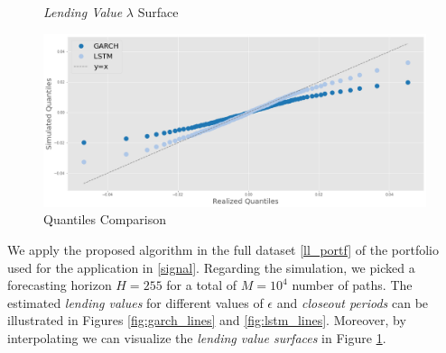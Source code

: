 \documentclass[a4paper, oneside]{discothesis}
\begin{document}
\begin{figure}[h]
    \centering
    \qquad
    \caption{\textit{Lending Value} $\lambda$ Surface}
    \label{fig:surface_LL}
\end{figure}

\begin{figure}[h]
    \centering
    \includegraphics[width = 12cm]{figures/QQ_simuls.png}
    \caption{Quantiles Comparison}
    \label{QQ_simuls}
\end{figure}

We apply the proposed algorithm in the full dataset \ref{ll_portf} of the portfolio used for the application in \ref{signal}. Regarding the simulation, we picked a forecasting horizon $H=255$ for a total of $M = 10^4$ number of paths. The estimated \textit{lending values} for different values of $\epsilon$ and \textit{closeout periods} can be illustrated in Figures \ref{fig:garch_lines} and \ref{fig:lstm_lines}. Moreover, by interpolating we can visualize the \textit{lending value surfaces} in Figure \ref{fig:surface_LL}.
\end{document}

